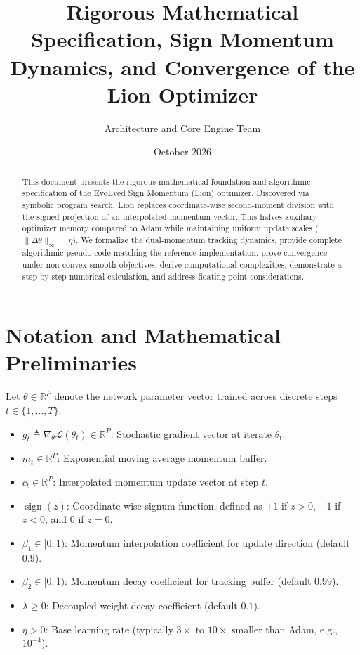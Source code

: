 \documentclass[11pt,a4paper]{article}
\title{\textbf{Rigorous Mathematical Specification, Sign Momentum Dynamics, and Convergence of the Lion Optimizer}}
\author{Architecture and Core Engine Team}
\date{October 2026}
\theoremstyle{definition}
\begin{document}
\maketitle

\begin{abstract}
This document presents the rigorous mathematical foundation and algorithmic specification of the EvoLved Sign Momentum (Lion) optimizer. Discovered via symbolic program search, Lion replaces coordinate-wise second-moment division with the signed projection of an interpolated momentum vector. This halves auxiliary optimizer memory compared to Adam while maintaining uniform update scales ($\|\Delta \theta\|_\infty = \eta$). We formalize the dual-momentum tracking dynamics, provide complete algorithmic pseudo-code matching the reference implementation, prove convergence under non-convex smooth objectives, derive computational complexities, demonstrate a step-by-step numerical calculation, and address floating-point considerations.
\end{abstract}

\section{Notation and Mathematical Preliminaries}

Let $\theta \in \mathbb{R}^P$ denote the network parameter vector trained across discrete steps $t \in \{1, \dots, T\}$.

\begin{itemize}
    \item $g_t \triangleq \nabla_\theta \mathcal{L}(\theta_t) \in \mathbb{R}^P$: Stochastic gradient vector at iterate $\theta_t$.
    \item $m_t \in \mathbb{R}^P$: Exponential moving average momentum buffer.
    \item $c_t \in \mathbb{R}^P$: Interpolated momentum update vector at step $t$.
    \item $\operatorname{sign}(z)$: Coordinate-wise signum function, defined as $+1$ if $z > 0$, $-1$ if $z < 0$, and $0$ if $z = 0$.
    \item $\beta_1 \in [0, 1)$: Momentum interpolation coefficient for update direction (default $0.9$).
    \item $\beta_2 \in [0, 1)$: Momentum decay coefficient for tracking buffer (default $0.99$).
    \item $\lambda \ge 0$: Decoupled weight decay coefficient (default $0.1$).
    \item $\eta > 0$: Base learning rate (typically $3\times$ to $10\times$ smaller than Adam, e.g., $10^{-4}$).
\end{itemize}
\end{document}
